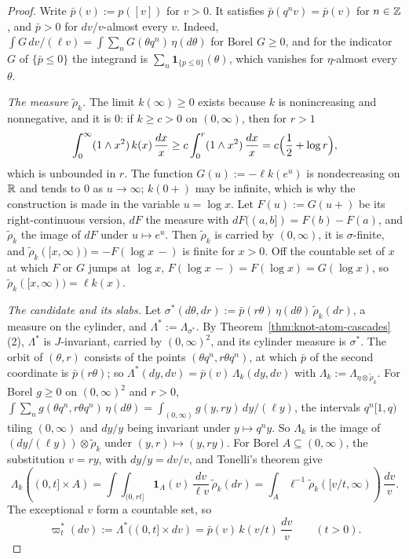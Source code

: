 \begin{proof}
Write $\bar p(v) := p([v])$ for $v > 0$. It satisfies $\bar p(q^nv) = \bar p(v)$ for $n \in \mathbb{Z}$,
and $\bar p > 0$ for $dv/v$-almost every $v$. Indeed, $\int G\,dv/(\ell v) =
\int\sum_nG(\theta q^n)\,\eta(d\theta)$ for Borel $G \ge 0$, and for the indicator $G$ of
$\{\bar p \le 0\}$ the integrand is $\sum_n\mathbf 1_{\{p \le 0\}}(\theta)$, which vanishes for
$\eta$-almost every $\theta$.

\emph{The measure $\tilde\rho_k$.} The limit $k(\infty) \ge 0$ exists because $k$ is
nonincreasing and nonnegative, and it is $0$: if $k \ge c > 0$ on $(0,\infty)$, then for $r > 1$
\[
  \int_0^\infty(1 \wedge x^2)\,k(x)\,\frac{dx}{x} \ge c\int_0^r(1 \wedge x^2)\,\frac{dx}{x}
  = c\Bigl(\frac12 + \log r\Bigr),
\]
which is unbounded in $r$. The function $G(u) := -\ell k(e^u)$ is nondecreasing on $\mathbb{R}$ and tends
to $0$ as $u \to \infty$; $k(0{+})$ may be infinite, which is why the construction is made in the
variable $u = \log x$. Let $F(u) := G(u{+})$ be its right-continuous version, $dF$ the measure with
$dF((a,b]) = F(b) - F(a)$, and $\tilde\rho_k$ the image of $dF$ under $u \mapsto e^u$. Then
$\tilde\rho_k$ is carried by $(0,\infty)$, it is $\sigma$-finite, and
$\tilde\rho_k([x,\infty)) = -F(\log x\,{-})$ is finite for $x > 0$. Off the countable set of $x$
at which $F$ or $G$ jumps at $\log x$, $F(\log x\,{-}) = F(\log x) = G(\log x)$, so
$\tilde\rho_k([x,\infty)) = \ell k(x)$.

\emph{The candidate and its slabs.} Let $\sigma^*(d\theta, dr) := \bar p(r\theta)\,\eta(d\theta)\,
\tilde\rho_k(dr)$, a measure on the cylinder, and $\Lambda^* := \Lambda_{\sigma^*}$. By
Theorem~\ref{thm:knot-atom-cascades}(2), $\Lambda^*$ is $J$-invariant, carried by $(0,\infty)^2$,
and its cylinder measure is $\sigma^*$. The orbit of $(\theta, r)$ consists of the points
$(\theta q^n, r\theta q^n)$, at which $\bar p$ of the second coordinate is $\bar p(r\theta)$; so
$\Lambda^*(dy, dv) = \bar p(v)\,\Lambda_k(dy, dv)$ with $\Lambda_k := \Lambda_{\eta \otimes
\tilde\rho_k}$. For Borel $g \ge 0$ on $(0,\infty)^2$ and $r > 0$,
$\int\sum_ng(\theta q^n, r\theta q^n)\,\eta(d\theta) = \int_{(0,\infty)}g(y, ry)\,dy/(\ell y)$, the
intervals $q^n[1,q)$ tiling $(0,\infty)$ and $dy/y$ being invariant under $y \mapsto q^ny$. So
$\Lambda_k$ is the image of $(dy/(\ell y)) \otimes \tilde\rho_k$ under $(y, r) \mapsto (y, ry)$.
For Borel $A \subseteq (0,\infty)$, the substitution $v = ry$, with $dy/y = dv/v$, and Tonelli's
theorem give
\[
  \Lambda_k((0,t] \times A) = \int\int_{(0,rt]}\mathbf 1_A(v)\,\frac{dv}{\ell v}\,\tilde\rho_k(dr)
  = \int_A\ell^{-1}\tilde\rho_k([v/t,\infty))\,\frac{dv}{v} .
\]
The exceptional $v$ form a countable set, so
\[
  \varpi^*_t(dv) := \Lambda^*((0,t] \times dv) = \bar p(v)\,k(v/t)\,\frac{dv}{v} \qquad (t > 0).
\]


\end{proof}
